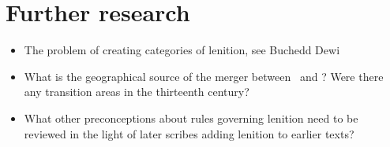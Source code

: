 \section{Further research}
\label{sec:further-research}
\begin{itemize}
\item The problem of creating categories of lenition, see Buchedd Dewi
\item What is the geographical source of the merger between \lT\ and \xD? Were there any transition areas in the thirteenth century?
\item What other preconceptions about rules governing lenition need to be reviewed in the light of later scribes adding lenition to earlier texts?
\end{itemize}



  



